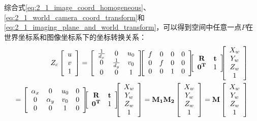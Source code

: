 综合式\ref{eq:2_1_image_coord_homogeneous}、\ref{eq:2_1_world_camera_coord_transform}和\ref{eq:2_1_imaging_plane_and_world_transform}，可以得到空间中任意一点$P$在世界坐标系和图像坐标系下的坐标转换关系：
%
\begin{eqnarray}\label{eq:2_1_image_and_world_transform}
Z_c
\left[\begin{array}{c} u \\ v \\ 1 \end{array} \right]
=
\left[\begin{array}{ccc}
\frac{1}{d_x} & 0 & u_0 \\
0 & \frac{1}{d_y} & v_0 \\
0 & 0 & 1
\end{array}\right]
\hspace{-6pt}
\left[\begin{array}{cccc}
f & 0 & 0 & 0 \\
0 & f & 0 & 0 \\
0 & 0 & 1 & 0
\end{array}\right]
\hspace{-6pt}
\left[\begin{array}{cc}
\mathbf{R} & \mathbf{t}  \\
\mathbf{0^T} & 1
\end{array}\right]
\hspace{-6pt}
\left[\begin{array}{c} X_w \\ Y_w \\ Z_w \\ 1 \end{array}\right] \nonumber
\\
= 
\left[\begin{array}{cccc}
\alpha_x & 0 & u_0 & 0 \\
0 & \alpha_y & v_0 & 0 \\
0 & 0 & 1 & 0
\end{array}\right]
\hspace{-6pt}
\left[\begin{array}{cc}
\mathbf{R} & \mathbf{t}  \\
\mathbf{0^T} & 1
\end{array}\right]
\hspace{-6pt}
\left[\begin{array}{c} X_w \\ Y_w \\ Z_w \\ 1 \end{array}\right]
=
\mathbf{M_1} \mathbf{M_2}
\left[\begin{array}{c} X_w \\ Y_w \\ Z_w \\ 1 \end{array}\right]
= \mathbf{M}
\left[\begin{array}{c} X_w \\ Y_w \\ Z_w \\ 1 \end{array}\right]
\end{eqnarray}
